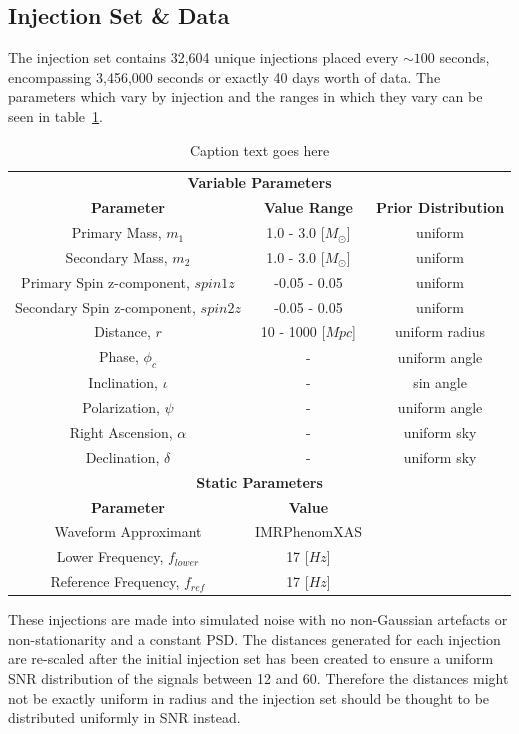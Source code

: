 \subsection{Injection Set \& Data}

The injection set contains 32,604 unique injections placed every $\sim100$ seconds, encompassing 3,456,000 seconds or exactly 40 days worth of data. The parameters which vary by injection and the ranges in which they vary can be seen in table~\ref{6:tab:ew_inj_params}.
%
\begin{table}[ht]
    \centering
    \setlength{\tabcolsep}{4pt}
    \begin{tabular}{ccc}
        \toprule
        \multicolumn{3}{c}{\textbf{Variable Parameters}} \\
        \cmidrule(lr){1-3}
        \textbf{Parameter} & \textbf{Value Range} & \textbf{Prior Distribution} \\
        \midrule
        Primary Mass, $m_1$ & 1.0 - 3.0 [$M_{\odot}$] & uniform \\
        Secondary Mass, $m_2$ & 1.0 - 3.0 [$M_{\odot}$] & uniform \\
        Primary Spin z-component, $spin1z$ & -0.05 - 0.05 & uniform \\
        Secondary Spin z-component, $spin2z$ & -0.05 - 0.05 & uniform \\
        Distance, $r$ & 10 - 1000 [$Mpc$] & uniform radius \\
        Phase, $\phi_{c}$ & - & uniform angle \\
        Inclination, $\iota$ & - & sin angle \\
        Polarization, $\psi$ & - & uniform angle \\
        Right Ascension, $\alpha$ & - & uniform sky \\
        Declination, $\delta$ & - & uniform sky \\
        \bottomrule
        \multicolumn{3}{c}{\textbf{Static Parameters}} \\
        \cmidrule(lr){1-3}
        \textbf{Parameter} & \textbf{Value} & \textbf{} \\
        \midrule
        Waveform Approximant & IMRPhenomXAS & \\
        Lower Frequency, $f_{lower}$ & 17 [$Hz$] & \\
        Reference Frequency, $f_{ref}$ & 17 [$Hz$] & \\
        \bottomrule
    \end{tabular}
    \caption{Caption text goes here}
    \label{6:tab:ew_inj_params}
\end{table}
%
These injections are made into simulated noise with no non-Gaussian artefacts or non-stationarity and a constant PSD. The distances generated for each injection are re-scaled after the initial injection set has been created to ensure a uniform SNR distribution of the signals between 12 and 60. Therefore the distances might not be exactly uniform in radius and the injection set should be thought to be distributed uniformly in SNR instead.

